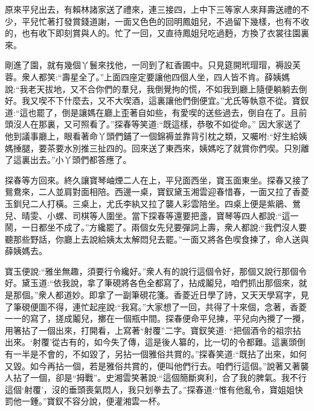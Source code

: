 \begin{parag}
    原來平兒出去，有賴林諸家送了禮來，連三接四，上中下三等家人來拜壽送禮的不少，平兒忙著打發賞錢道謝，一面又色色的回明鳳姐兒，不過留下幾樣，也有不收的，也有收下即刻賞與人的。忙了一回，又直待鳳姐兒吃過麪，方換了衣裳往園裏來。
\end{parag}


\begin{parag}
    剛進了園，就有幾個丫鬟來找他，一同到了紅香圃中。只見筵開玳瑁瑁，褥設芙蓉。衆人都笑:“壽星全了。”上面四座定要讓他四個人坐，四人皆不肯。薛姨媽說:“我老天拔地，又不合你們的羣兒，我倒覺拘的慌，不如我到廳上隨便躺躺去倒好。我又喫不下什麼去，又不大喫酒，這裏讓他們倒便宜。”尤氏等執意不從。寶釵道:“這也罷了，倒是讓媽在廳上歪著自如些，有愛喫的送些過去，倒自在了。且前頭沒人在那裏，又可照看了。”探春等笑道:“既這樣，恭敬不如從命。” 因大家送了他到議事廳上，眼看著命丫頭們鋪了一個錦褥並靠背引枕之類，又囑咐:“好生給姨媽捶腿，要茶要水別推三扯四的。回來送了東西來，姨媽吃了就賞你們喫。只別離了這裏出去。”小丫頭們都答應了。
\end{parag}


\begin{parag}
    探春等方回來。終久讓寶琴岫煙二人在上，平兒面西坐，寶玉面東坐。探春又接了鴛鴦來，二人並肩對面相陪。西邊一桌，寶釵黛玉湘雲迎春惜春，一面又拉了香菱玉釧兒二人打橫。三桌上，尤氏李紈又拉了襲人彩雲陪坐。四桌上便是紫鵑、鶯兒、晴雯、小螺、司棋等人圍坐。當下探春等還要把盞，寶琴等四人都說:“這一鬧，一日都坐不成了。”方纔罷了。兩個女先兒要彈詞上壽，衆人都說:“我們沒人要聽那些野話，你廳上去說給姨太太解悶兒去罷。”一面又將各色喫食揀了，命人送與薛姨媽去。
\end{parag}


\begin{parag}
    寶玉便說:“雅坐無趣，須要行令纔好。”衆人有的說行這個令好，那個又說行那個令好。黛玉道:“依我說，拿了筆硯將各色全都寫了，拈成鬮兒，咱們抓出那個來，就是那個。”衆人都道妙。即拿了一副筆硯花箋。香菱近日學了詩，又天天學寫字，見了筆硯便圖不得，連忙起座說:“我寫。”大家想了一回，共得了十來個，念著，香菱一一的寫了，搓成鬮兒，擲在一個瓶中間。探春便命平兒揀，平兒向內攪了一攪，用箸拈了一個出來，打開看，上寫著“射覆”二字。寶釵笑道: “把個酒令的祖宗拈出來。‘射覆’從古有的，如今失了傳，這是後人纂的，比一切的令都難。這裏頭倒有一半是不會的，不如毀了，另拈一個雅俗共賞的。”探春笑道:“既拈了出來，如何又毀。如今再拈一個，若是雅俗共賞的，便叫他們行去。咱們行這個。”說著又著襲人拈了一個，卻是“拇戰”。史湘雲笑著說:“這個簡斷爽利，合了我的脾氣。我不行這個‘射覆’，沒的垂頭喪氣悶人，我只划拳去了。”探春道:“惟有他亂令，寶姐姐快罰他一鍾。”寶釵不容分說，便灌湘雲一杯。
\end{parag}


